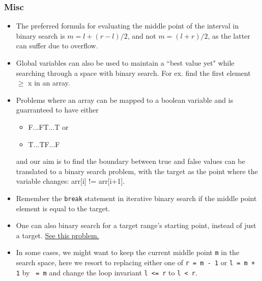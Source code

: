 \documentclass{article}
\newcommand*{\algodis}[4]{
    \textbf{#1:} #2\\%
    \textbf{Time:} #3 \\%
    \textbf{Space:} #4
}
\begin{document}
\subsubsection*{Misc}
\begin{itemize}
    \item The preferred formula for evaluating the middle point of
    the interval in binary search is
    $m = l + (r-l)/2$, and not
    $m = (l+r)/2$, as the latter can suffer due to overflow.
    \item Global variables can also be used to maintain a ``best value yet" while searching through a space with binary search. For ex. find the first element $\geq$ x in an array.
    \item Problems where an array can be mapped to a boolean variable and is guarranteed to have either
    \begin{itemize}
        \item F...FT...T or
        \item T...TF...F
    \end{itemize}
    and our aim is to find the boundary between true and false
    values can be translated to a binary search problem, with 
    the target as the point where the variable changes:
    arr[i] != arr[i+1].
    \item Remember the \texttt{break} statement in iterative binary search if the middle point element is equal to the target.
    \item One can also binary search for a target range's starting point, instead of just a target. \href{https://leetcode.com/problems/find-k-closest-elements/}{See this problem.}
    \item In some cases, we might want to keep the current middle point \texttt{m} in the search space,
    here we resort to replacing either one of \texttt{r = m - 1} or \texttt{l = m + 1} by \texttt{ = m}
    and change the loop invariant \texttt{l <= r} to \texttt{l < r}. 
\end{itemize}
\end{document}
